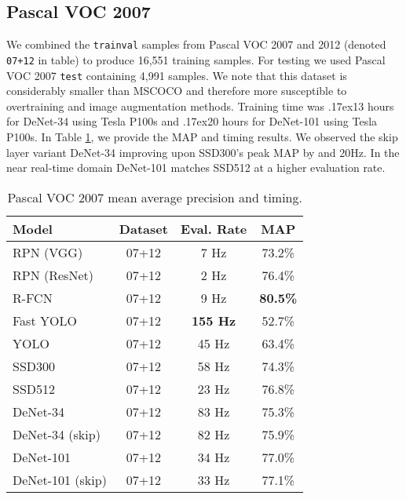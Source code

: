 \documentclass[10pt,twocolumn]{article}
\newcommand\approxtilde{\raise.17ex\hbox{}}
\begin{document}
\subsection{Pascal VOC 2007}
We combined the \texttt{trainval} samples from Pascal VOC 2007 and 2012 \cite{pascal-voc} (denoted \texttt{07+12} in table) to produce 16,551 training samples. For testing we used Pascal VOC 2007 \texttt{test} containing 4,991 samples. We note that this dataset is considerably smaller than MSCOCO and therefore more susceptible to overtraining and image augmentation methods. Training time was \approxtilde 13 hours for DeNet-34 using  Tesla P100s and \approxtilde 20 hours for DeNet-101 using  Tesla P100s. In Table \ref{table:voc2007}, we provide the MAP and timing results. We observed the skip layer variant DeNet-34 improving upon SSD300's peak MAP by  and 20Hz. In the near real-time domain DeNet-101 matches SSD512 at a higher evaluation rate. 







\begin{table}[tb]
\begin{center}
\begin{tabular}{ l|c|c|c}
 Model & Dataset & Eval. Rate & MAP \\
\hline
\rowcolor[gray]{.85} RPN (VGG) & 07+12 & 7 Hz & 73.2\% \\
\rowcolor[gray]{.85} RPN (ResNet) & 07+12 & 2 Hz & 76.4\% \\
\rowcolor[gray]{.85} R-FCN & 07+12 & 9 Hz & \textbf{80.5\%}  \\
Fast YOLO & 07+12& \textbf{155 Hz} & 52.7\%  \\
YOLO & 07+12& 45 Hz & 63.4\%  \\
SSD300 & 07+12& 58 Hz & 74.3\% \\
SSD512 & 07+12& 23 Hz & 76.8\%  \\
\hline
DeNet-34 & 07+12 & 83 Hz &  75.3\% \\
DeNet-34 (skip) & 07+12 & 82 Hz &  75.9\% \\
DeNet-101 & 07+12 & 34 Hz & 77.0\% \\
DeNet-101 (skip) & 07+12 & 33 Hz & 77.1\% \\
\end{tabular}
\end{center}
\caption{Pascal VOC 2007 mean average precision and timing. }
\label{table:voc2007}
\end{table}
\end{document}
